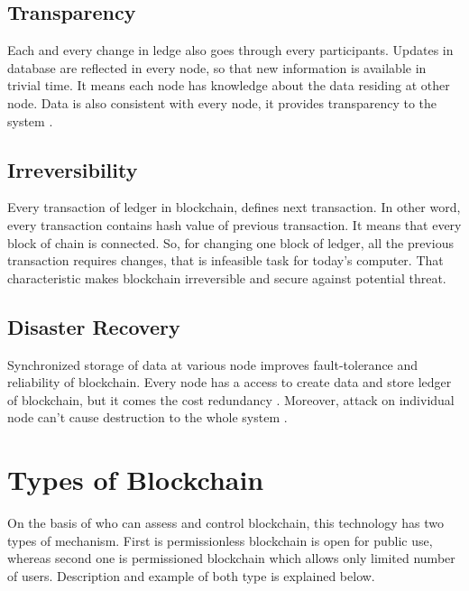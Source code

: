 \documentclass[a4paper,twoside,12pt]{report}
\begin{document}
\begin{spacing}{1.5}
\subsection{Transparency}
Each and every change in ledge also goes through every participants. Updates in database are reflected in every node, so that new information is available in trivial time. It means each node has knowledge about the data residing at other node. Data is also consistent with every node, it provides transparency to the system \cite{satoshinakamoto}.  
\subsection{Irreversibility}
Every transaction of ledger in blockchain, defines next transaction. In other word, every transaction contains hash value of previous transaction. It means that every block of chain is connected. So, for changing one block of ledger, all the previous transaction requires changes, that is infeasible task for today's computer. That characteristic makes blockchain irreversible and secure against potential threat.
\subsection{Disaster Recovery}
Synchronized storage of data at various node improves fault-tolerance and reliability of blockchain. Every node has a access to create data and store ledger of blockchain, but it comes the cost redundancy \cite{democraticmininginbitcoins,minerevolutioninbitcoinnetwork}.   
Moreover, attack on individual node can't cause destruction to the whole system \cite{fangfangdai}. 
\section{Types of Blockchain}
On the basis of who can assess and control blockchain, this technology has two types of mechanism. First is permissionless blockchain is open for public use, whereas second one is permissioned blockchain which allows only limited number of users. Description and example of both type is explained below.       

\end{spacing}
\end{document}
